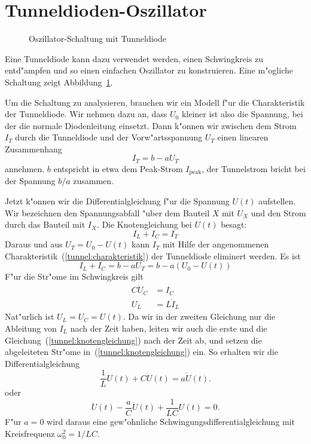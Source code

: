 %
%
%
\section{Tunneldioden-Oszillator}
\begin{figure}
\centering

\caption{Oszillator-Schaltung mit Tunneldiode
\label{tunnel:tunneldioden-oszillator}}
\end{figure}
Eine Tunneldiode kann dazu verwendet werden, einen Schwingkreis zu
entd"ampfen und so einen einfachen Oszillator zu konstruieren.
Eine m"ogliche Schaltung zeigt Abbildung~\ref{tunnel:tunneldioden-oszillator}.

Um die Schaltung zu analysieren, brauchen wir ein Modell f"ur die
Charakteristik der Tunneldiode. Wir nehmen dazu an, dass $U_0$ kleiner
ist also die Spannung, bei der die normale Diodenleitung einsetzt.
Dann k"onnen wir zwischen dem Strom $I_T$ durch die Tunneldiode
und der Vorw"artsspannung $U_T$ einen linearen Zusammenhang
\begin{equation}
I_T=b-aU_T
\label{tunnel:charakteristik}
\end{equation}
annehmen. $b$ entspricht in etwa dem Peak-Strom $I_{\text{peak}}$, der
Tunnelstrom bricht bei der Spannung $b/a$ zusammen.

Jetzt k"onnen wir die Differentialgleichung f"ur die Spannung $U(t)$
aufstellen. Wir bezeichnen den Spannungsabfall "uber dem Bauteil $X$
mit $U_X$ und den Strom durch das Bauteil mit $I_X$. Die Knotengleichung
bei $U(t)$ besagt:
\[
I_L+I_C=I_T
\]
Daraus und aus $U_T=U_0-U(t)$ kann $I_T$ mit Hilfe der angenommenen
Charakteristik~(\ref{tunnel:charakteristik}) der Tunneldiode eliminert werden.
Es ist
\begin{equation}
I_L+I_C=b-aU_T=b-a(U_0-U(t))
\label{tunnel:knotengleichung}
\end{equation}
F"ur die Str"ome im Schwingkreis gilt
\begin{align*}
C\dot U_C&=I_C \\
U_L&=L\dot I_L
\end{align*}
Nat"urlich ist $U_L=U_C=U(t)$.
Da wir in der zweiten Gleichung nur die Ableitung von $I_L$ nach
der Zeit haben, leiten wir
auch die erste und die Gleichung~(\ref{tunnel:knotengleichung}) nach
der Zeit ab, und setzen die abgeleiteten Str"ome
in~(\ref{tunnel:knotengleichung}) ein.
So erhalten wir die Differentialgleichung
\begin{equation*}
\frac1{L}U(t) +C\ddot U(t)=a\dot U(t).
\end{equation*}
oder
\begin{equation}
\ddot U(t)
-\frac{a}{C}\dot U(t)
+\frac1{LC}U(t)
=0.
\label{tunnel:dgl1}
\end{equation}
F"ur $a=0$ wird daraus eine gew"ohnliche Schwingungsdifferentialgleichung
mit Kreisfrequenz $\omega_0^2=1/LC$.

